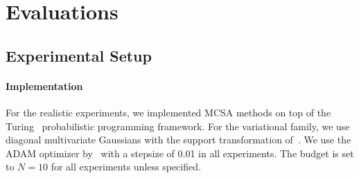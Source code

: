 
\vspace{-1ex}
\section{Evaluations}\label{section:eval}
\vspace{-1.5ex}
\subsection{Experimental Setup}
\vspace{-1.5ex}
\paragraph{Implementation}
For the realistic experiments, we implemented MCSA methods on top of the Turing~\citep{ge2018t} probabilistic programming framework.%
For the variational family, we use diagonal multivariate Gaussians with the support transformation of~\citet{JMLR:v18:16-107}.
We use the ADAM optimizer by~\citet{kingma_adam_2015} with a stepsize of 0.01 in all experiments.
The budget is set to \(N=10\) for all experiments unless specified.

